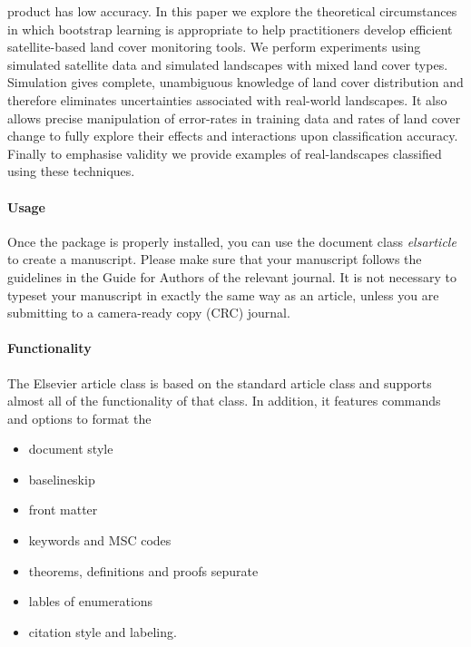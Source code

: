 product has low accuracy.  In this paper we explore the theoretical circumstances in which bootstrap learning is appropriate to help practitioners develop efficient satellite-based land cover monitoring tools.  We perform experiments using simulated satellite data and simulated landscapes with mixed land cover types.  Simulation gives complete, unambiguous knowledge of land cover distribution and therefore eliminates uncertainties associated with real-world landscapes.  It also allows precise manipulation of error-rates in training data and rates of land cover change to fully explore their effects and interactions upon classification accuracy.  Finally to emphasise validity we provide examples of real-landscapes classified using these techniques. 



\paragraph{Usage} Once the package is properly installed, you can use the document class \emph{elsarticle} to create a manuscript. Please make sure that your manuscript follows the guidelines in the Guide for Authors of the relevant journal. It is not necessary to typeset your manuscript in exactly the same way as an article, unless you are submitting to a camera-ready copy (CRC) journal.

\paragraph{Functionality} The Elsevier article class is based on the standard article class and supports almost all of the functionality of that class. In addition, it features commands and options to format the
\begin{itemize}
\item document style
\item baselineskip
\item front matter
\item keywords and MSC codes
\item theorems, definitions and proofs sepurate
\item lables of enumerations
\item citation style and labeling.
\end{itemize}